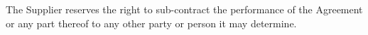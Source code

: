 \documentclass[nz-terms]{subfiles}
\begin{document}
The Supplier reserves the right to sub-contract the performance of the Agreement
or any part thereof to any other party or person it may determine.
\end{document}
